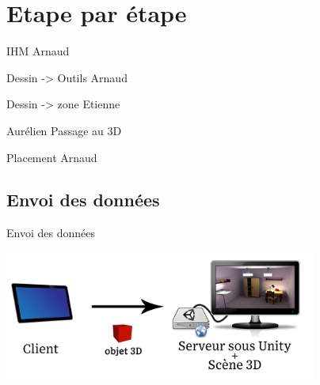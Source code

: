 \documentclass[a4paper,10pt]{beamer}
\begin{document}
			
	\section{Etape par étape}
	\begin{frame}
		IHM Arnaud
	\end{frame}
	
	\begin{frame}
		Dessin -> Outils Arnaud
	\end{frame}
	
	\begin{frame}
		Dessin -> zone Etienne
	\end{frame}
	
	\begin{frame}
		Aurélien Passage au 3D
	\end{frame}
	
	\begin{frame}
		Placement Arnaud
	\end{frame}
	
	\subsection{Envoi des données}
	
	\begin{frame}{Envoi des données}
		\centerline{\includegraphics[height=120pt]{images/network/sending_model2.png}}
	\end{frame}
	
\end{document}
